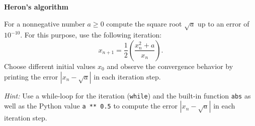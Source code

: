 \textbf{Heron's algorithm}

For a nonnegative number $a\ge 0$ compute the square root $\sqrt{a}$ up to an error of $10^{-10}$. For this purpose, use the following iteration:
$$ x_{n+1}=\frac{1}{2} \left(\frac{x_n^2+a}{x_n}\right) \nonumber.$$ 
Choose different initial values $x_0$ and observe the convergence behavior by printing the error $|x_n-\sqrt{a}|$ in each iteration step.

\textit{Hint:} Use a while-loop for the iteration (\verb|while|) and the built-in function \verb|abs| as well as the Python value \verb|a ** 0.5| to compute the error $|x_n-\sqrt{a}|$ in each iteration step.
